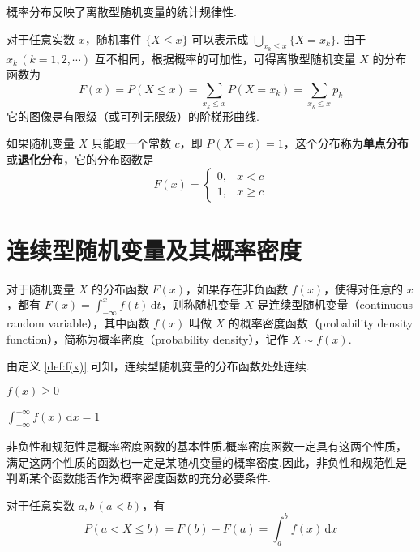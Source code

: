 概率分布反映了离散型随机变量的统计规律性.

对于任意实数 $x$，随机事件 $\{X \leqslant x\}$ 可以表示成 $\displaystyle\bigcup_{x_k \leqslant x} \{X=x_k\}$. 由于 $x_k\, (k=1,2,\cdots)$ 互不相同，根据概率的可加性，可得离散型随机变量 $X$ 的分布函数为
$$
F(x) = P(X \leqslant x) = \sum_{x_k \leqslant x} P(X=x_k) = \sum_{x_k \leqslant x} p_k
$$
它的图像是有限级（或可列无限级）的阶梯形曲线.

如果随机变量 $X$ 只能取一个常数 $c$，即 $P(X=c) = 1$，这个分布称为\textbf{单点分布}或\textbf{退化分布}，它的分布函数是
$$
F(x) = \begin{cases}
    0, & x < c \\
    1, & x \geqslant c
\end{cases}
$$

\section{连续型随机变量及其概率密度}

\begin{definition}[][][def:f(x)]
    \indent 对于随机变量 $X$ 的分布函数 $F(x)$，如果存在非负函数 $f(x)$，使得对任意的 $x$，都有 $F(x)=\displaystyle\int_{-\infty}^x f(t)\,\text{d}t$，则称随机变量 $X$ 是{\heiti 连续型随机变量}（continuous random variable），其中函数 $f(x)$ 叫做 $X$ 的{\heiti 概率密度函数}（probability density function），简称为{\heiti 概率密度}（probability density），记作 $X \sim f(x)$.
\end{definition}

由定义 \ref{def:f(x)} 可知，连续型随机变量的分布函数处处连续.

\begin{property}[][非负性][prop:f(x)>=0]
    \indent $f(x) \geqslant 0$
\end{property}

\begin{property}[][规范性][prop:f(x):integral=1]
    \indent $\displaystyle\int_{-\infty}^{+\infty} f(x)\,\text{d}x = 1$
\end{property}

非负性和规范性是概率密度函数的基本性质.概率密度函数一定具有这两个性质，满足这两个性质的函数也一定是某随机变量的概率密度.因此，非负性和规范性是判断某个函数能否作为概率密度函数的充分必要条件.

\begin{property}
    \indent 对于任意实数 $a,b\,(a<b)$，有
    $$
    P(a < X \leqslant b) = F(b)-F(a) = \int_a^b f(x)\,\text{d}x
    $$
\end{property}

